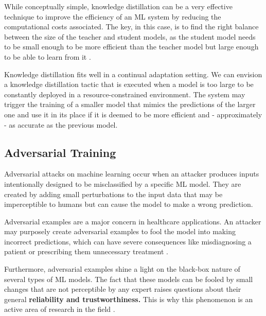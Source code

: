 \documentclass[../main.tex]{subfiles}
\begin{document}
    While conceptually simple, knowledge distillation can be a very effective technique to improve the efficiency of an ML system by reducing the computational costs associated. The key, in this case, is to find the right balance between the size of the teacher and student models, as the student model needs to be small enough to be more efficient than the teacher model but large enough to be able to learn from it \cite{hinton_distilling_2015}.

    Knowledge distillation fits well in a continual adaptation setting. We can envision a knowledge distillation tactic that is executed when a model is too large to be constantly deployed in a resource-constrained environment. The system may trigger the training of a smaller model that mimics the predictions of the larger one and use it in its place if it is deemed to be more efficient and - approximately - as accurate as the previous model.

    


    \subsection{Adversarial Training} \label{sec:adversarial_training} 

    Adversarial attacks on machine learning occur when an attacker produces inputs intentionally designed to be misclassified by a specific ML model. They are created by adding small perturbations to the input data that may be imperceptible to humans but can cause the model to make a wrong prediction.
    
    Adversarial examples are a major concern in healthcare applications. An attacker may purposely create adversarial examples to fool the model into making incorrect predictions, which can have severe consequences like misdiagnosing a patient or prescribing them unnecessary treatment \cite{finlayson_adversarial_2019}. 

    
    Furthermore, adversarial examples shine a light on the black-box nature of several types of ML models. The fact that these models can be fooled by small changes that are not perceptible by any expert raises questions about their general \textbf{reliability and trustworthiness.} This is why this phenomenon is an active area of research in the field \cite{finlayson_adversarial_2019}.
    
\end{document}
